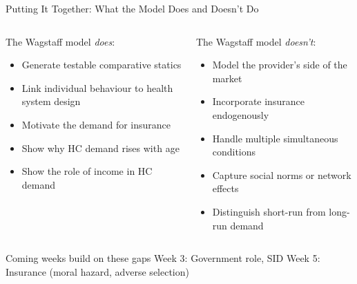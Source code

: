 \documentclass[aspectratio=169, 12pt]{beamer}
\begin{document}
\begin{frame}{Putting It Together: What the Model Does and Doesn't Do}
  \begin{columns}
      \begin{block}{The Wagstaff model \emph{does}:}
        \footnotesize
        \begin{itemize}
          \item Generate testable comparative statics
          \item Link individual behaviour to health system design
          \item Motivate the demand for insurance
          \item Show why HC demand rises with age
          \item Show the role of income in HC demand
        \end{itemize}
      \end{block}
      \begin{alertblock}{The Wagstaff model \emph{doesn't}:}
        \footnotesize
        \begin{itemize}
          \item Model the provider's side of the market
          \item Incorporate insurance endogenously
          \item Handle multiple simultaneous conditions
          \item Capture social norms or network effects
          \item Distinguish short-run from long-run demand
        \end{itemize}
      \end{alertblock}
  \end{columns}
  \vspace{0.2em}
  \begin{exampleblock}{Coming weeks build on these gaps}
    \small Week 3: Government role, SID \quad Week 5: Insurance (moral hazard, adverse selection)
  \end{exampleblock}
\end{frame}

\end{document}
